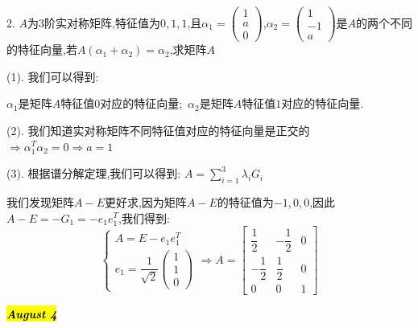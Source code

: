 2. $A$为$3$阶实对称矩阵,特征值为$0,1,1$,且$\alpha_{1}=\left( \begin{matrix}
	1\\a\\0
\end{matrix}\right)$,$\alpha_{2}=\left( \begin{matrix}
	1\\-1\\a
\end{matrix}\right)$是$A$的两个不同的特征向量,若$A(\alpha_{1}+\alpha_{2})=\alpha_{2}$,求矩阵$A$
\begin{solution}

	(1). 我们可以得到:  
	
	$\alpha_{1}$是矩阵$A$特征值$0$对应的特征向量;\ $\alpha_{2}$是矩阵$A$特征值$1$对应的特征向量.
	
	(2). 我们知道实对称矩阵不同特征值对应的特征向量是正交的$\Rightarrow \alpha_{1}^{T}\alpha_{2}=0\Rightarrow a=1$
	
	(3). 根据谱分解定理,我们可以得到:  $A=\sum\limits_{i=1}^{3}\lambda_{i}G_{i}$
	
	我们发现矩阵$A-E$更好求,因为矩阵$A-E$的特征值为$-1,0,0$,因此$A-E=-G_{1}=-e_{1}e_{1}^{T}$,我们得到:  
	$$\left\lbrace
	\begin{array}{l}
		A=E-e_{1}e_{1}^{T}\\
		e_{1}=\dfrac{1}{\sqrt{2}}\left( \begin{matrix}
			1\\1\\0
		\end{matrix}\right) 
	\end{array}
	\right. \Rightarrow A=\left[ \begin{matrix}
		\dfrac{1}{2}&-\dfrac{1}{2}&0\\
		-\dfrac{1}{2}&\dfrac{1}{2}&0\\
		0&0&1
	\end{matrix}\right] $$
\end{solution}

\hl{\textbf{\textit{August 4}}}

